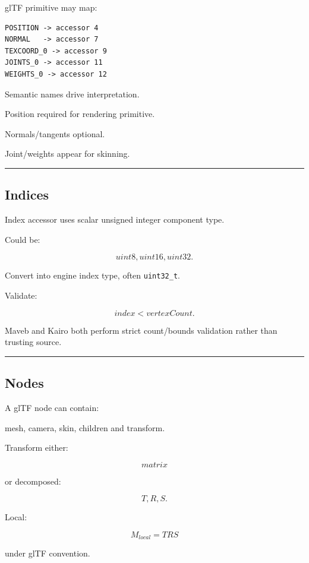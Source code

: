 glTF primitive may map:

\begin{verbatim}
POSITION -> accessor 4
NORMAL   -> accessor 7
TEXCOORD_0 -> accessor 9
JOINTS_0 -> accessor 11
WEIGHTS_0 -> accessor 12
\end{verbatim}

Semantic names drive interpretation.

Position required for rendering primitive.

Normals/tangents optional.

Joint/weights appear for skinning.

\begin{center}\rule{0.5\linewidth}{0.5pt}\end{center}

\subsection{Indices}\label{04-visual-computing-ii-ch041-indices}

Index accessor uses scalar unsigned integer component type.

Could be:

\[
uint8,uint16,uint32.
\]

Convert into engine index type, often \texttt{uint32\_t}.

Validate:

\[
index<vertexCount.
\]

Maveb and Kairo both perform strict count/bounds validation rather than trusting source.

\begin{center}\rule{0.5\linewidth}{0.5pt}\end{center}

\subsection{Nodes}\label{04-visual-computing-ii-ch041-nodes}

A glTF node can contain:

mesh, camera, skin, children and transform.

Transform either:

\[
matrix
\]

or decomposed:

\[
T,R,S.
\]

Local:

\[
M_{local}
=
T
R
S
\]

under glTF convention.

